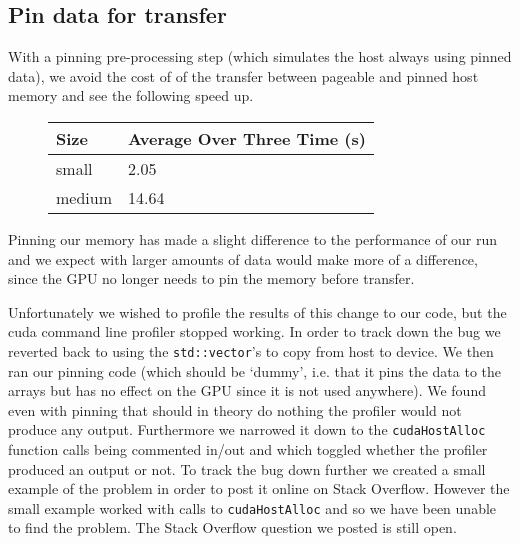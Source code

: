 \subsection*{Pin data for transfer}
With a pinning pre-processing step (which simulates the host always using pinned data), we avoid the cost of of the transfer between pageable and pinned host memory and see the following speed up.
\begin{figure}[H]\centering \begin{tabular}{ l | l }
  \hline
  Size & Average Over Three Time (s) \\
  \hline
  \hline
  small & 2.05 \\
  medium & 14.64 \\
  \hline
\end{tabular} \end{figure}

Pinning our memory has made a slight difference to the performance of our run and we expect with larger amounts of data would make more of a difference, since the GPU no longer needs to pin the memory before transfer.

Unfortunately we wished to profile the results of this change to our code, but the cuda command line profiler stopped working. In order to track down the bug we reverted back to using the \verb!std::vector!'s to copy from host to device. We then ran our pinning code (which should be `dummy', i.e. that it pins the data to the arrays but has no effect on the GPU since it is not used anywhere). We found even with pinning that should in theory do nothing the profiler would not produce any output. Furthermore we narrowed it down to the \verb!cudaHostAlloc! function calls being commented in/out and which toggled whether the profiler produced an output or not.
To track the bug down further we created a small example of the problem in order to post it online on Stack Overflow. However the small example worked with calls to \verb!cudaHostAlloc! and so we have been unable to find the problem. The Stack Overflow question we posted is still open.\cite{so_profiler}
